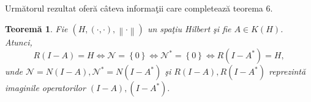 \documentclass[a4paper,12pt,oneside]{report}
\newtheorem{theorem}{Teorem\u a}
\begin{document}
Urm\u{a}torul rezultat ofer\u{a} c\^{a}teva informa\c{t}ii care completeaz\u{a} teorema 6.
\begin{theorem}
Fie \(\left ( H,\left ( \cdot ,\cdot  \right ),\left \| \cdot  \right \| \right )\) un spa\c{t}iu Hilbert \c{s}i fie \(A \in K\left ( H \right )\). Atunci,
\begin{displaymath}
  R\left ( I-A \right ) = H \Leftrightarrow {\mathcal{N}} = \left \{ 0 \right \}\Leftrightarrow {\mathcal{N}}^{\ast } = \left \{ 0 \right \}\Leftrightarrow R \left ( I - A^{\ast } \right ) = H,
\end{displaymath}
unde \({\mathcal{N}} =  N\left ( I - A \right ), {\mathcal{N}} ^{\ast } = N\left ( I - A^{\ast } \right ) \) \c{s}i \(R \left ( I - A\right ) , R \left ( I - A^{\ast } \right )\) reprezint\u{a} imaginile operatorilor \(\left ( I - A \right ) , \left ( I - A^{\ast } \right ). \)
\end{theorem}
\end{document}
